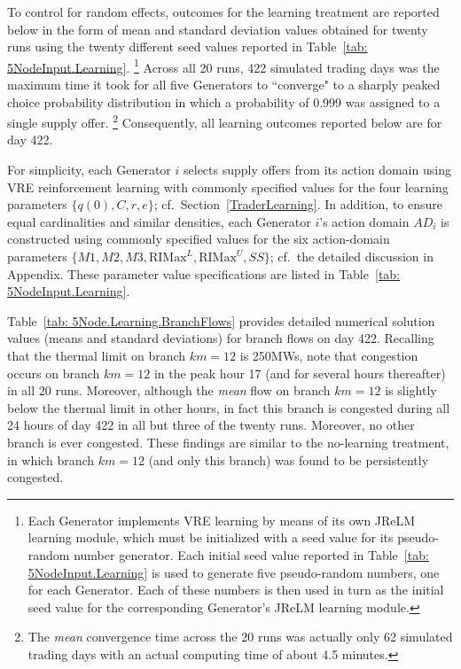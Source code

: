 \documentclass[12pt]{article}
\begin{document}
To control for random effects, outcomes for the learning treatment are reported below in the form of mean and standard deviation values obtained for twenty runs using the twenty different seed values reported in Table~\ref{tab: 5NodeInput.Learning}.%
        \footnote{Each Generator implements VRE learning by means of its own JReLM learning module, which must be initialized with a seed value for its pseudo-random number generator.  Each initial seed value reported in Table~\ref{tab: 5NodeInput.Learning} is used to generate five pseudo-random numbers, one for each Generator.  Each of these numbers is then used in turn as the initial seed value for the corresponding Generator's JReLM learning module.} 
      Across all 20 runs, 422 simulated trading days was the maximum time it took for all five Generators to ``converge" to a sharply peaked choice probability distribution in which a probability of 0.999 was assigned to a single supply offer.%
    \footnote{The \textit{mean\/} convergence time across the 20 runs was actually only 62 simulated trading days with an actual computing time of about 4.5 minutes.}   
       Consequently, all learning outcomes reported below are for day 422.  
       
For simplicity, each Generator $i$ selects supply offers from its action domain using VRE reinforcement learning with commonly specified values for the four learning parameters $\{q(0),C, r,e\}$; cf.\ Section~\ref{TraderLearning}.  In addition, to ensure equal cardinalities and similar densities, each Generator $i$'s action domain $AD_i$ is constructed using commonly specified values for the six action-domain parameters $\{M1,M2,M3,\mbox{RIMax}^L,\mbox{RIMax}^U,SS\}$; cf.\ the detailed discussion in Appendix.  These parameter value specifications are listed in Table~\ref{tab: 5NodeInput.Learning}.  
       
Table~\ref{tab: 5Node.Learning.BranchFlows} provides detailed numerical solution values (means and standard deviations) for branch flows on day 422.  Recalling that the thermal limit on branch $km=12$ is 250MWs, note that congestion occurs on branch $km=12$ in the peak hour 17 (and for several hours thereafter) in all 20 runs.  Moreover, although 
the \textit{mean\/} flow on branch $km=12$ is slightly below the thermal limit in other hours, in fact this branch is congested during all 24 hours of day 422 in all but three of the twenty runs.  Moreover, no other branch is ever congested.  These findings are similar to  the no-learning treatment, in which branch $km=12$ (and only this branch) was found to be persistently congested.   
\end{document}
